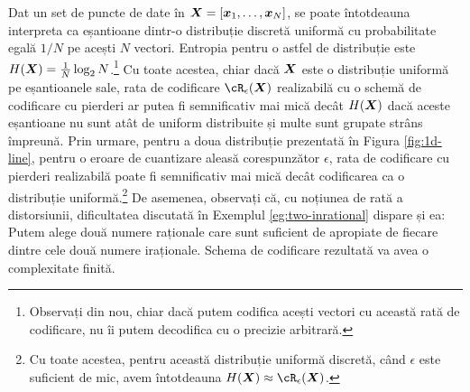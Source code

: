 \documentclass[../../book-main_ro.tex]{subfiles}
\begin{document}
\begin{remark}
    Dat un set de puncte de date în $\bm{X} = [\bm{x}_1,\ldots, \bm{x}_N]$, se poate întotdeauna interpreta ca eșantioane dintr-o distribuție discretă uniformă cu probabilitate egală $1/N$ pe acești $N$ vectori. Entropia pentru o astfel de distribuție este $H(\bm{X}) = \frac{1}{N}\log_2 N$.\footnote{Observați din nou, chiar dacă putem codifica acești vectori cu această rată de codificare, nu îi putem decodifica cu o precizie arbitrară.} Cu toate acestea, chiar dacă $\bm{X}$ este o distribuție uniformă pe eșantioanele sale, rata de codificare $\cR_{\epsilon}(\X)$ realizabilă cu o schemă de codificare cu pierderi ar putea fi semnificativ mai mică decât $H(\bm{X})$ dacă aceste eșantioane nu sunt atât de uniform distribuite și multe sunt grupate strâns împreună. Prin urmare, pentru a doua distribuție prezentată în Figura \ref{fig:1d-line}, pentru o eroare de cuantizare aleasă corespunzător $\epsilon$, rata de codificare cu pierderi realizabilă poate fi semnificativ mai mică decât codificarea ca o distribuție uniformă.\footnote{Cu toate acestea, pentru această distribuție uniformă discretă, când $\epsilon$ este suficient de mic, avem întotdeauna $H(\X) \approx \cR_{\epsilon}(\X)$.} De asemenea, observați că, cu noțiunea de rată a distorsiunii, dificultatea discutată în Exemplul \ref{eg:two-inrational} dispare și ea: Putem alege două numere raționale care sunt suficient de apropiate de fiecare dintre cele două numere iraționale. Schema de codificare rezultată va avea o complexitate finită.
\end{remark}
\end{document}
